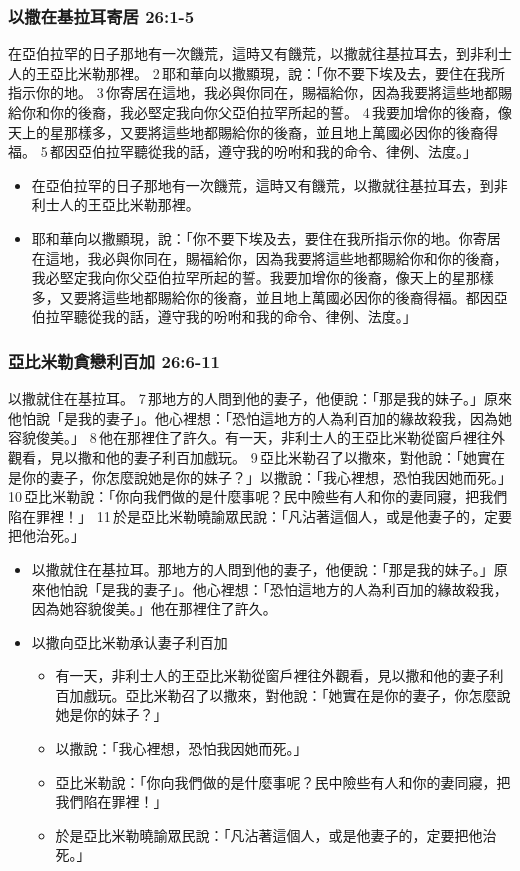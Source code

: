 \subsubsection{以撒在基拉耳寄居 26:1-5 }
\noindent 
在亞伯拉罕的日子那地有一次饑荒，這時又有饑荒，以撒就往基拉耳去，到非利士人的王亞比米勒那裡。 2 耶和華向以撒顯現，說：「你不要下埃及去，要住在我所指示你的地。 3 你寄居在這地，我必與你同在，賜福給你，因為我要將這些地都賜給你和你的後裔，我必堅定我向你父亞伯拉罕所起的誓。 4 我要加增你的後裔，像天上的星那樣多，又要將這些地都賜給你的後裔，並且地上萬國必因你的後裔得福。 5 都因亞伯拉罕聽從我的話，遵守我的吩咐和我的命令、律例、法度。」

\begin{itemize} 
\itemsep-.35em 
\item 在亞伯拉罕的日子那地有一次饑荒，這時又有饑荒，以撒就往基拉耳去，到非利士人的王亞比米勒那裡。 
\item 耶和華向以撒顯現，說：「你不要下埃及去，要住在我所指示你的地。你寄居在這地，我必與你同在，賜福給你，因為我要將這些地都賜給你和你的後裔，我必堅定我向你父亞伯拉罕所起的誓。我要加增你的後裔，像天上的星那樣多，又要將這些地都賜給你的後裔，並且地上萬國必因你的後裔得福。都因亞伯拉罕聽從我的話，遵守我的吩咐和我的命令、律例、法度。」
\end{itemize} 

\subsubsection{亞比米勒貪戀利百加 26:6-11 }
以撒就住在基拉耳。 7 那地方的人問到他的妻子，他便說：「那是我的妹子。」原來他怕說「是我的妻子」。他心裡想：「恐怕這地方的人為利百加的緣故殺我，因為她容貌俊美。」 8 他在那裡住了許久。有一天，非利士人的王亞比米勒從窗戶裡往外觀看，見以撒和他的妻子利百加戲玩。 9 亞比米勒召了以撒來，對他說：「她實在是你的妻子，你怎麼說她是你的妹子？」以撒說：「我心裡想，恐怕我因她而死。」 10 亞比米勒說：「你向我們做的是什麼事呢？民中險些有人和你的妻同寢，把我們陷在罪裡！」 11 於是亞比米勒曉諭眾民說：「凡沾著這個人，或是他妻子的，定要把他治死。」


\begin{itemize} 
\itemsep-.35em 
\item 以撒就住在基拉耳。那地方的人問到他的妻子，他便說：「那是我的妹子。」原來他怕說「是我的妻子」。他心裡想：「恐怕這地方的人為利百加的緣故殺我，因為她容貌俊美。」他在那裡住了許久。
\item 以撒向亞比米勒承认妻子利百加
\begin{itemize} 
\itemsep-.35em 
\item 有一天，非利士人的王亞比米勒從窗戶裡往外觀看，見以撒和他的妻子利百加戲玩。亞比米勒召了以撒來，對他說：「她實在是你的妻子，你怎麼說她是你的妹子？」
\item 以撒說：「我心裡想，恐怕我因她而死。」
\item 亞比米勒說：「你向我們做的是什麼事呢？民中險些有人和你的妻同寢，把我們陷在罪裡！」
\item 於是亞比米勒曉諭眾民說：「凡沾著這個人，或是他妻子的，定要把他治死。」
\end{itemize} 
\end{itemize} 

